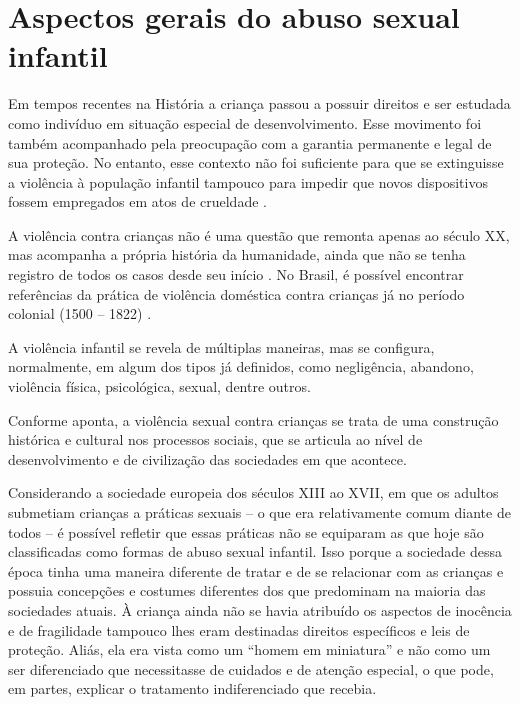 
\chapter{Aspectos gerais do abuso sexual infantil}

Em tempos recentes na História a criança passou a possuir direitos e ser estudada como indivíduo em situação especial de desenvolvimento. Esse movimento foi também acompanhado pela preocupação com a garantia permanente e legal de sua proteção. No entanto, esse contexto não foi suficiente para que se extinguisse a violência à população infantil tampouco para impedir que novos dispositivos fossem empregados em atos de crueldade \cite{CAMPOS2002}. 

A violência contra crianças não é uma questão que remonta apenas ao século XX, mas acompanha a própria história da humanidade, ainda que não se tenha registro de todos os casos desde seu início . No Brasil, é possível encontrar referências da prática de violência doméstica contra crianças já no período colonial (1500 -- 1822) \cite{LONGO2002}.

A violência infantil se revela de múltiplas maneiras, mas se configura, normalmente, em algum dos tipos já definidos, como negligência, abandono, violência física, psicológica,  sexual, dentre outros. 

Conforme  aponta, a violência sexual contra crianças se trata de uma  construção histórica e cultural nos processos sociais, que se articula ao nível de desenvolvimento e de civilização das sociedades em que acontece. 

Considerando a sociedade europeia dos séculos XIII ao XVII, em que os adultos submetiam crianças a práticas sexuais -- o que era relativamente comum diante de todos -- é possível refletir que essas práticas não se equiparam as que hoje são classificadas como formas de abuso sexual infantil. Isso porque a sociedade dessa época tinha uma maneira diferente de tratar e de se relacionar com as crianças e possuia concepções e costumes diferentes dos que predominam na maioria das sociedades atuais. À criança ainda não se havia atribuído os aspectos de inocência e de fragilidade tampouco lhes eram destinadas direitos específicos e leis de proteção. Aliás, ela era vista como um ``homem em miniatura'' \cite{ARIES2011} e não como um ser diferenciado que necessitasse de cuidados e de atenção especial, o que pode, em partes, explicar o tratamento indiferenciado que recebia. 

